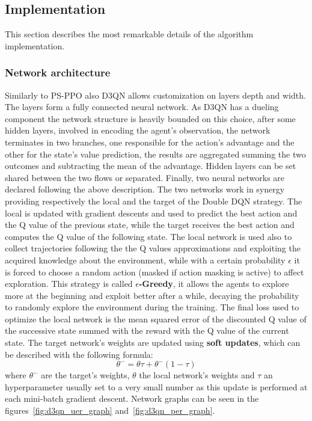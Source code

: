 \documentclass[11pt, a4paper, hidelinks]{report}
\begin{document}
\subsection{Implementation}\label{subsec:implementation2}

This section describes the most remarkable details of the algorithm implementation.

\subsubsection{Network architecture}

Similarly to PS-PPO also D3QN allows customization on layers depth and width.
The layers form a fully connected neural network.
As D3QN has a dueling component the network structure is heavily bounded on this choice, after some hidden layers, involved in encoding the agent's observation, the network terminates in two branches, one responsible for the action's advantage and the other for the state's value prediction, the results are aggregated summing the two outcomes and subtracting the mean of the advantage.
Hidden layers can be set shared between the two flows or separated.
Finally, two neural networks are declared following the above description.
The two networks work in synergy providing respectively the local and the target of the Double DQN strategy.
The local is updated with gradient descents and used to predict the best action and the Q value of the previous state, while the target receives the best action and computes the Q value of the following state.
The local network is used also to collect trajectories following the the Q values approximations and exploiting the acquired knowledge about the environment, while with a certain probability $\epsilon$ it is forced to choose a random action (masked if action masking is active) to affect exploration.
This strategy is called \textbf{$\epsilon$-Greedy}, it allows the agents to explore more at the beginning and exploit better after a while, decaying the probability to randomly explore the environment during the training.
The final loss used to optimize the local network is the mean squared error of the discounted Q value of the successive state summed with the reward with the Q value of the current state.
The target network's weights are updated using \textbf{soft updates}, which can be described with the following formula:
\begin{equation}
	\theta^{-} = \theta \tau + \theta^{-}(1 - \tau)\label{eq:soft-update}
\end{equation}
where $\theta^{-}$ are the target's weights, $\theta$ the local network's weights and $\tau$ an hyperparameter usually set to a very small number as this update is performed at each mini-batch gradient descent.
Network graphs can be seen in the figures~\ref{fig:d3qn_uer_graph} and~\ref{fig:d3qn_per_graph}.
\end{document}
